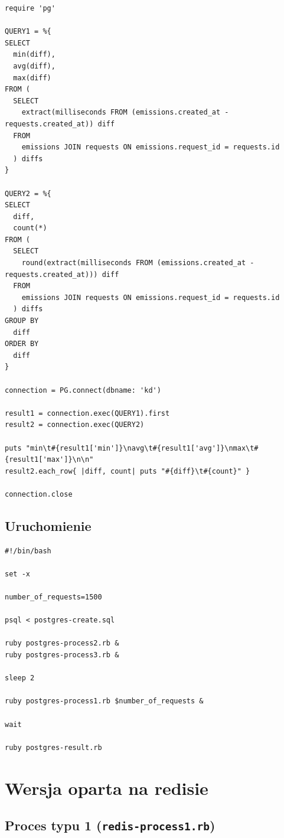 \documentclass[a4paper,11pt]{article}
\begin{document}
\begin{lstlisting}
require 'pg'

QUERY1 = %{
SELECT
  min(diff),
  avg(diff),
  max(diff)
FROM (
  SELECT
    extract(milliseconds FROM (emissions.created_at - requests.created_at)) diff
  FROM
    emissions JOIN requests ON emissions.request_id = requests.id
  ) diffs
}

QUERY2 = %{
SELECT
  diff,
  count(*)
FROM (
  SELECT
    round(extract(milliseconds FROM (emissions.created_at - requests.created_at))) diff
  FROM
    emissions JOIN requests ON emissions.request_id = requests.id
  ) diffs
GROUP BY
  diff
ORDER BY
  diff
}

connection = PG.connect(dbname: 'kd')

result1 = connection.exec(QUERY1).first
result2 = connection.exec(QUERY2)

puts "min\t#{result1['min']}\navg\t#{result1['avg']}\nmax\t#{result1['max']}\n\n"
result2.each_row{ |diff, count| puts "#{diff}\t#{count}" }

connection.close
\end{lstlisting}


\subsection{Uruchomienie}

\begin{lstlisting}
#!/bin/bash

set -x

number_of_requests=1500

psql < postgres-create.sql

ruby postgres-process2.rb &
ruby postgres-process3.rb &

sleep 2

ruby postgres-process1.rb $number_of_requests &

wait

ruby postgres-result.rb
\end{lstlisting}


\section{Wersja oparta na redisie}


\subsection{Proces typu 1 (\texttt{redis-process1.rb})}
\end{document}
